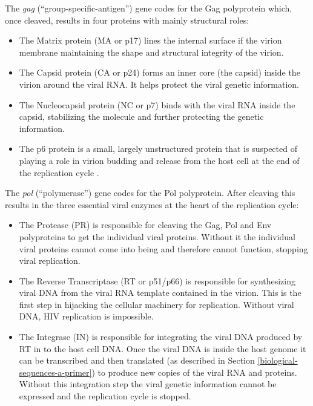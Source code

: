 \documentclass[
  11pt,
  twoside,
  BCOR=10mm,
  listof=totoc]{scrbook}
\begin{document}
The \emph{gag} (``group-specific-antigen'') gene codes for the Gag polyprotein which, once cleaved, results in four proteins with mainly structural roles:

\begin{itemize}
\item
  The Matrix protein (MA or p17) lines the internal surface if the virion membrane maintaining the shape and structural integrity of the virion.
\item
  The Capsid protein (CA or p24) forms an inner core (the capsid) inside the virion around the viral RNA. It helps protect the viral genetic information.
\item
  The Nucleocapsid protein (NC or p7) binds with the viral RNA inside the capsid, stabilizing the molecule and further protecting the genetic information.
\item
  The p6 protein is a small, largely unstructured protein \autocite{fossenSolutionStructureHuman2005} that is suspected of playing a role in virion budding and release from the host cell at the end of the replication cycle \autocite{gottlingerEffectMutationsAffecting1991,huangP6GagRequiredParticle1995}.
\end{itemize}

The \emph{pol} (``polymerase'') gene codes for the Pol polyprotein. After cleaving this results in the three essential viral enzymes at the heart of the replication cycle:

\begin{itemize}
\item
  The Protease (PR) is responsible for cleaving the Gag, Pol and Env polyproteins to get the individual viral proteins. Without it the individual viral proteins cannot come into being and therefore cannot function, stopping viral replication.
\item
  The Reverse Transcriptase (RT or p51/p66) is responsible for synthesizing viral DNA from the viral RNA template contained in the virion. This is the first step in hijacking the cellular machinery for replication. Without viral DNA, HIV replication is impossible.
\item
  The Integrase (IN) is responsible for integrating the viral DNA produced by RT in to the host cell DNA. Once the viral DNA is inside the host genome it can be transcribed and then translated (as described in Section \ref{biological-sequences-a-primer}) to produce new copies of the viral RNA and proteins. Without this integration step the viral genetic information cannot be expressed and the replication cycle is stopped.
\end{itemize}
\end{document}
